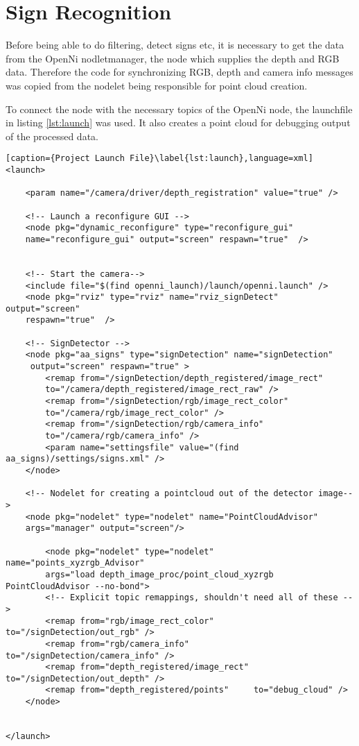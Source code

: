 \graphicspath{{./Software/img/}}
\chapter{Sign Recognition}\label{chapter:SignRecognition}
 
 Before being able to do filtering, detect signs etc, it is necessary to get the data from the OpenNi nodletmanager,
 the node which supplies the depth and RGB data. Therefore the code for synchronizing RGB, 
 depth and camera info messages was copied from the nodelet being responsible 
 for point cloud creation. 
 
To connect the node with the necessary topics of the OpenNi node, the launchfile in listing \vref{lst:launch}
was used. It also creates a point cloud for debugging output of the processed data.

\begin{lstlisting}[caption={Project Launch File}\label{lst:launch},language=xml]
<launch>

	<param name="/camera/driver/depth_registration" value="true" />	

	<!-- Launch a reconfigure GUI -->
	<node pkg="dynamic_reconfigure" type="reconfigure_gui" 
	name="reconfigure_gui" output="screen" respawn="true"  />
	
	
	<!-- Start the camera-->
	<include file="$(find openni_launch)/launch/openni.launch" />
	<node pkg="rviz" type="rviz" name="rviz_signDetect" output="screen" 
	respawn="true"  />

	<!-- SignDetector -->
	<node pkg="aa_signs" type="signDetection" name="signDetection" 
	 output="screen" respawn="true" > 
 		<remap from="/signDetection/depth_registered/image_rect" 	
 		to="/camera/depth_registered/image_rect_raw" />
 		<remap from="/signDetection/rgb/image_rect_color" 			
 		to="/camera/rgb/image_rect_color" />
 		<remap from="/signDetection/rgb/camera_info" 				
 		to="/camera/rgb/camera_info" />
 		<param name="settingsfile" value="(find aa_signs)/settings/signs.xml" />
	</node>

  	<!-- Nodelet for creating a pointcloud out of the detector image-->
	<node pkg="nodelet" type="nodelet" name="PointCloudAdvisor" 
	args="manager" output="screen"/>

		<node pkg="nodelet" type="nodelet" name="points_xyzrgb_Advisor" 
		args="load depth_image_proc/point_cloud_xyzrgb PointCloudAdvisor --no-bond">
	    <!-- Explicit topic remappings, shouldn't need all of these -->
	    <remap from="rgb/image_rect_color"        to="/signDetection/out_rgb" />
	    <remap from="rgb/camera_info"             to="/signDetection/camera_info" />
	    <remap from="depth_registered/image_rect" to="/signDetection/out_depth" />
	    <remap from="depth_registered/points"     to="debug_cloud" />
  	</node>
  	
  	
</launch>
\end{lstlisting}

